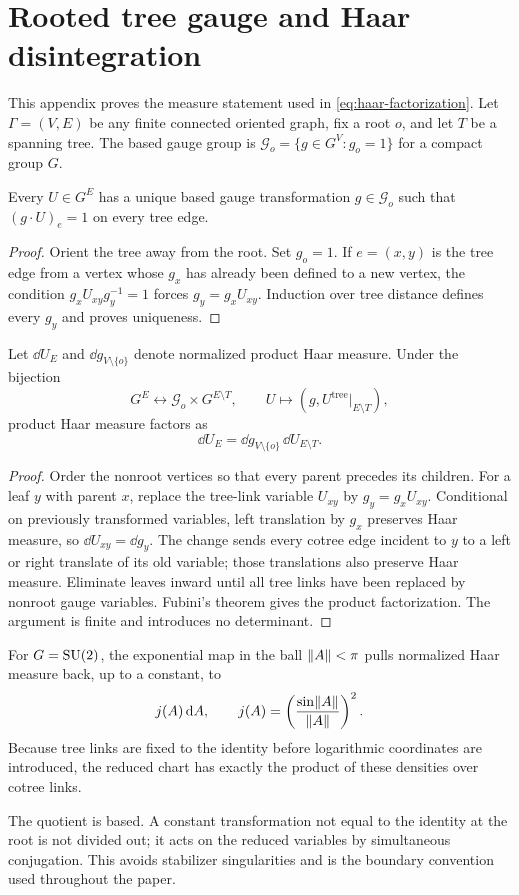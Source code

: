 \section{Rooted tree gauge and Haar disintegration}\label{app:tree-gauge}

This appendix proves the measure statement used in
\eqref{eq:haar-factorization}.  Let $\Gamma=(V,E)$ be any finite connected
oriented graph, fix a root $o$, and let $T$ be a spanning tree.  The based
gauge group is $\mathcal G_o=\{g\in G^V:g_o=1\}$ for a compact group $G$.

\begin{lemma}\label{lem:unique-tree}
Every $U\in G^E$ has a unique based gauge transformation $g\in\mathcal G_o$
such that $(g\cdot U)_e=1$ on every tree edge.
\end{lemma}

\begin{proof}
Orient the tree away from the root.  Set $g_o=1$.  If $e=(x,y)$ is the tree
edge from a vertex whose $g_x$ has already been defined to a new vertex, the
condition $g_xU_{xy}g_y^{-1}=1$ forces $g_y=g_xU_{xy}$.  Induction over tree
distance defines every $g_y$ and proves uniqueness.
\end{proof}

\begin{proposition}\label{prop:tree-haar}
Let $\dd U_E$ and $\dd g_{V\setminus\{o\}}$ denote normalized product Haar
measure.  Under the bijection
\[
 G^E\longleftrightarrow
 \mathcal G_o\times G^{E\setminus T},
 \qquad U\longmapsto(g,U^{\mathrm{tree}}|_{E\setminus T}),
\]
product Haar measure factors as
\[
 \dd U_E=\dd g_{V\setminus\{o\}}\,\dd U_{E\setminus T}.
\]
\end{proposition}

\begin{proof}
Order the nonroot vertices so that every parent precedes its children.  For a
leaf $y$ with parent $x$, replace the tree-link variable $U_{xy}$ by
$g_y=g_xU_{xy}$.  Conditional on previously transformed variables, left
translation by $g_x$ preserves Haar measure, so $\dd U_{xy}=\dd g_y$.  The
change sends every cotree edge incident to $y$ to a left or right translate of
its old variable; those translations also preserve Haar measure.  Eliminate
leaves inward until all tree links have been replaced by nonroot gauge
variables.  Fubini's theorem gives the product factorization.  The argument is
finite and introduces no determinant.
\end{proof}

For $G=\mathrm{SU}(2)$, the exponential map in the ball $\lVert A\rVert<\pi$ pulls normalized
Haar measure back, up to a constant, to
\[
 j(A)\,\mathrm d A,\qquad j(A)=\left(\frac{\sin\lVert A\rVert}{\lVert A\rVert}\right)^2.
\]
Because tree links are fixed to the identity before logarithmic coordinates
are introduced, the reduced chart has exactly the product of these densities
over cotree links.

The quotient is based.  A constant transformation not equal to the identity
at the root is not divided out; it acts on the reduced variables by
simultaneous conjugation.  This avoids stabilizer singularities and is the
boundary convention used throughout the paper.
